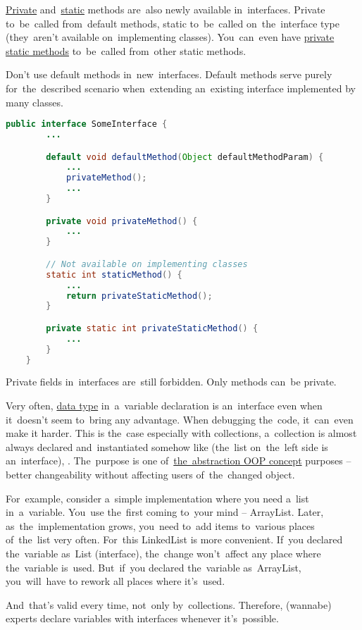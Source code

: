 \hyperref[javaprivate]{Private} and~\hyperref[javastatic]{static} methods are~also newly available in~interfaces.
Private to~be~called from~default methods, static to~be~called on~the~interface type (they~aren't available on~implementing classes).
You~can~even have \hyperref[javaprivatestaticmethods]{private static methods} to~be~called from~other static methods.

\warning Don't use default methods in~new~interfaces.
Default methods serve purely for~the~described scenario when~extending an~existing interface implemented by many classes.

\begin{lstlisting}[language=Java]
    public interface SomeInterface {
        ...

        default void defaultMethod(Object defaultMethodParam) {
            ...
            privateMethod();
            ...
        }

        private void privateMethod() {
            ...
        }

        // Not available on implementing classes
        static int staticMethod() {
            ...
            return privateStaticMethod();
        }

        private static int privateStaticMethod() {
            ...
        }
    }
\end{lstlisting}

\notenonl Private fields in~interfaces are~still forbidden.
Only methods can~be private.
\newpage

Very often, \hyperref[datatypes]{data type} in~a~variable declaration is an~interface even when it~doesn't seem to~bring any advantage.
When debugging the~code, it~can~even make it harder.
This is the~case especially with collections, a~collection is almost always declared and~instantiated somehow like  (the~list on~the~left side is an~interface), .
The~purpose is one of~\hyperref[abstraction]{the~abstraction OOP concept} purposes -- better changeability without affecting users of~the~changed object.

For~example, consider a~simple implementation where you need a~list in~a~variable.
You~use the~first coming to~your mind -- ArrayList.
Later, as~the~implementation grows, you~need to~add items to~various places of~the~list very often.
For~this LinkedList is more convenient.
If~you declared the~variable as~List (interface), the~change won't~affect any place where the~variable is~used.
But~if~you declared the~variable as~ArrayList, you~will~have to rework all places where it's~used.

And~that's valid every time, not~only by~collections.
Therefore, (wannabe) experts declare variables with interfaces whenever it's~possible.
